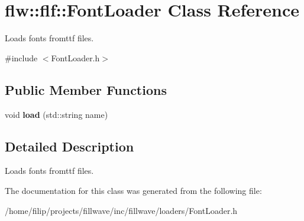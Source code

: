 \hypertarget{classflw_1_1flf_1_1FontLoader}{}\section{flw\+:\+:flf\+:\+:Font\+Loader Class Reference}
\label{classflw_1_1flf_1_1FontLoader}


Loads fonts fromttf files.  




{\ttfamily \#include $<$Font\+Loader.\+h$>$}

\subsection*{Public Member Functions}
\begin{DoxyCompactItemize}
\item 
\mbox{\label{classflw_1_1flf_1_1FontLoader_ab749fb5cf17cc2ee89072fe1295e72ba}} 
void {\bfseries load} (std\+::string name)
\end{DoxyCompactItemize}


\subsection{Detailed Description}
Loads fonts fromttf files. 

The documentation for this class was generated from the following file\+:\begin{DoxyCompactItemize}
\item 
/home/filip/projects/fillwave/inc/fillwave/loaders/Font\+Loader.\+h\end{DoxyCompactItemize}
